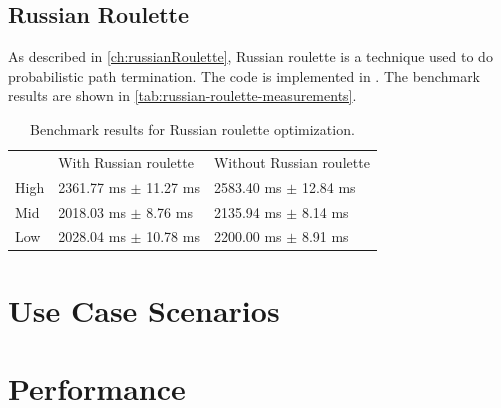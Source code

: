 \subsection{Russian Roulette}

As described in \autoref{ch:russianRoulette}, Russian roulette is a technique used to do probabilistic path termination. The code is implemented in . The benchmark results are shown in \autoref{tab:russian-roulette-measurements}.

\begin{table}[H]
    \centering
    \begin{tabular}{@{}lll@{}}
    \toprule
    & With Russian roulette & Without Russian roulette \\
    High & 2361.77 ms $\pm$ 11.27 ms & 2583.40 ms $\pm$ 12.84 ms \\
    Mid & 2018.03 ms $\pm$ 8.76 ms & 2135.94 ms $\pm$ 8.14 ms \\
    Low & 2028.04 ms $\pm$ 10.78 ms & 2200.00 ms $\pm$ 8.91 ms \\
    \bottomrule
    \end{tabular}
    \caption{Benchmark results for Russian roulette optimization.}
    \label{tab:russian-roulette-measurements}
\end{table}

\section{Use Case Scenarios}
\section{Performance}